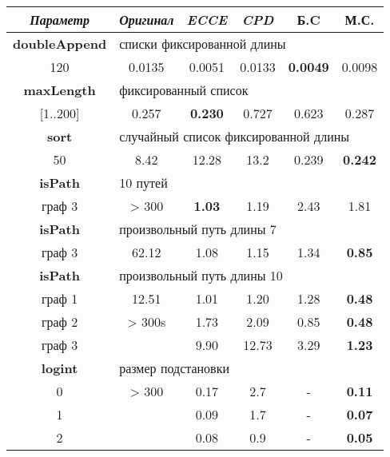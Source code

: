 \begin{table}[h!]
\center
\begin{tabular}{|c|c|c|c|c|c|}
\hline
{\it Параметр} & {\it Оригинал} & {\it ECCE }  & {\it CPD} & {\bf Б.C} & {\bf М.С.} \\ \hline
{\bf doubleAppend} & \multicolumn{5}{|l|}{списки фиксированной длины } \\ \hline
120                & 0.0135 & 0.0051 & 0.0133 & {\bf 0.0049} & 0.0098 \\ \hline


{\bf maxLength} & \multicolumn{5}{|l|}{фиксированный список} \\ \hline

       [1..200] & 0.257 & {\bf 0.230} & 0.727 & 0.623 & 0.287 \\ \hline


{\bf sort} & \multicolumn{5}{|l|}{случайный список фиксированной длины } \\ \hline
50       & 8.42     & 12.28 & 13.2 & 0.239  & {\bf 0.242} \\ \hline

 {\bf isPath} & \multicolumn{5}{|l|}{10 путей} \\ \hline
  граф 3      & > 300 & {\bf 1.03} & 1.19 & 2.43 & 1.81 \\ \hline

 {\bf isPath} & \multicolumn{5}{|l|}{произвольный путь длины 7} \\ \hline
   граф 3     & 62.12 & 1.08 & 1.15 & 1.34 & {\bf 0.85} \\ \hline
 {\bf isPath} & \multicolumn{5}{|l|}{произвольный путь длины 10} \\ \hline
 граф 1  &  12.51  & 1.01 & 1.20 &  1.28 & {\bf 0.48} \\
 граф 2  &  > 300s & 1.73 & 2.09 & 0.85 & {\bf 0.48} \\ 
 граф 3  &         & 9.90 & 12.73& 3.29 & {\bf 1.23} \\
 \hline

{\bf logint} & \multicolumn{5}{|l|}{размер подстановки} \\ \hline
0 & > 300    & 0.17  & 2.7  & -  &  {\bf 0.11} \\
1 &          & 0.09  & 1.7  & -  &  {\bf 0.07} \\
2 &          & 0.08   & 0.9  & -  & {\bf 0.05} \\
\hline


\end{tabular}
\end{table}
